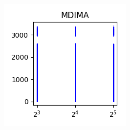 \documentclass[sigconf,authorversion]{acmart}
\begin{document}
\begin{figure}[hbtp]
\begin{subfigure}[b]{0.3\textwidth}
        \label{fig:ndimc}
    \end{subfigure}
    \begin{subfigure}[b]{0.3\textwidth}
        \includegraphics[width=\textwidth]{img/MDIMA.png}
        \label{fig:mdima}
    \end{subfigure}
\end{figure}
\end{document}
